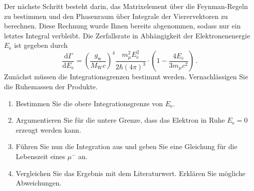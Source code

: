 \documentclass{exercise}
\begin{document}
Der nächste Schritt besteht darin, das Matrixelement über die Feynman-Regeln zu bestimmen und den Phasenraum über Integrale der Vierervektoren zu berechnen.
Diese Rechnung wurde Ihnen bereits abgenommen, sodass nur ein letztes Integral verbleibt. 
Die Zerfallsrate in Abhängigkeit der Elektronenenergie $E_\text{e}$ ist gegeben durch 
\begin{equation}
    \dfrac{\mathrm{d} \Gamma}{\mathrm{d} E_\text{e}} = \left(\dfrac{g_\text{w}}{M_\text{W}c}\right)^4 \dfrac{m_\mu^2 E^2_\text{e}}{2\hbar \left( 4 \pi\right)^3} \cdot \left(1 - \dfrac{4 E_e}{3 m_\mu c^2}\right) \,.
\end{equation}
Zunächst müssen die Integrationsgrenzen bestimmt werden. Vernachlässigen Sie die Ruhemassen der Produkte.
\begin{enumerate}[resume] 
    \item Bestimmen Sie die obere Integrationsgrenze von $E_\text{e}$. 
    \item Argumentieren Sie für die untere Grenze, dass das Elektron in Ruhe $E_\text{e} = 0$ erzeugt werden kann.  

    \item Führen Sie nun die Integration aus und geben Sie eine Gleichung für die Lebenszeit eines $\mu^-$ an.

    \item Vergleichen Sie das Ergebnis mit dem Literaturwert. Erklären Sie mögliche Abweichungen.
\end{enumerate}
    
\end{document}
